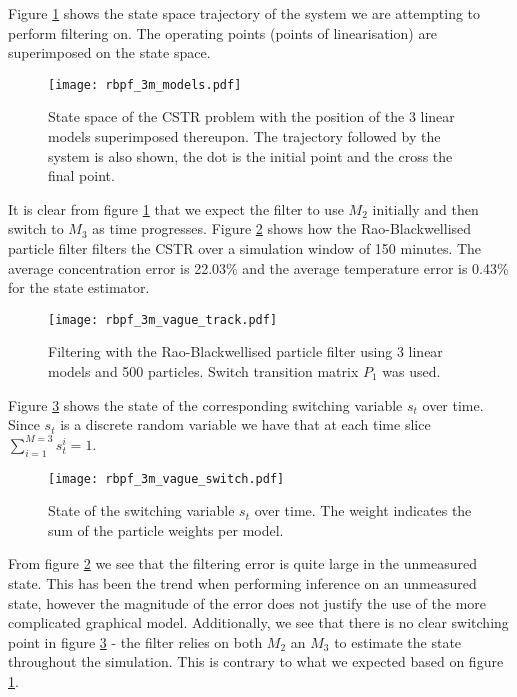 Figure \ref{fig_3m_models} shows the state space trajectory of the system we are attempting to perform filtering on. The operating points (points of linearisation) are superimposed on the state space.
\begin{figure}[H] 
\centering
\texttt{[image: rbpf\_3m\_models.pdf]}
\caption{State space of the CSTR problem with the position of the 3 linear models superimposed thereupon. The trajectory followed by the system is also shown, the dot is the initial point and the cross the final point.}
\label{fig_3m_models}
\end{figure}
It is clear from figure \ref{fig_3m_models} that we expect the filter to use $M_2$ initially and then switch to $M_3$ as time progresses. Figure \ref{fig_3m_vage_track} shows how the Rao-Blackwellised particle filter filters the CSTR over a simulation window of 150 minutes. The average concentration error is 22.03\% and the average temperature error is 0.43\% for the state estimator.
\begin{figure}[H] 
\centering
\texttt{[image: rbpf\_3m\_vague\_track.pdf]}
\caption{Filtering with the Rao-Blackwellised particle filter using 3 linear models and 500 particles. Switch transition matrix $P_1$ was used.}
\label{fig_3m_vage_track}
\end{figure}
Figure \ref{fig_3m_vage_switch} shows the state of the corresponding switching variable $s_t$ over time. Since $s_t$ is a discrete random variable we have that at each time slice $\sum_{i=1}^{M=3} s_t^i = 1$.
\begin{figure}[H] 
\centering
\texttt{[image: rbpf\_3m\_vague\_switch.pdf]}
\caption{State of the switching variable $s_t$ over time. The weight indicates the sum of the particle weights per model.}
\label{fig_3m_vage_switch}
\end{figure}
From figure \ref{fig_3m_vage_track} we see that the filtering error is quite large in the unmeasured state. This has been the trend when performing inference on an unmeasured state, however the magnitude of the error does not justify the use of the more complicated graphical model. Additionally, we see that there is no clear switching point in figure \ref{fig_3m_vage_switch} - the filter relies on both $M_2$ an $M_3$ to estimate the state throughout the simulation. This is contrary to what we expected based on figure \ref{fig_3m_models}.

